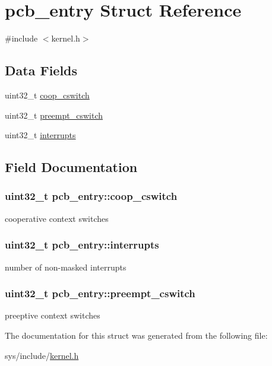 \hypertarget{structpcb__entry}{\section{pcb\-\_\-entry Struct Reference}
\label{structpcb__entry}
}


{\ttfamily \#include $<$kernel.\-h$>$}

\subsection*{Data Fields}
\begin{DoxyCompactItemize}
\item 
uint32\-\_\-t \hyperlink{structpcb__entry_ac5899befd89fa0e8b2aeceed85e01415}{coop\-\_\-cswitch}
\item 
uint32\-\_\-t \hyperlink{structpcb__entry_af49c7195c79f5de2d70825e2252c8d77}{preempt\-\_\-cswitch}
\item 
uint32\-\_\-t \hyperlink{structpcb__entry_ae5474e1d477335caf5515d8a940d1f77}{interrupts}
\end{DoxyCompactItemize}


\subsection{Field Documentation}
\hypertarget{structpcb__entry_ac5899befd89fa0e8b2aeceed85e01415}{
\subsubsection[{coop\-\_\-cswitch}]{\setlength{\rightskip}{0pt plus 5cm}uint32\-\_\-t pcb\-\_\-entry\-::coop\-\_\-cswitch}}\label{structpcb__entry_ac5899befd89fa0e8b2aeceed85e01415}
cooperative context switches \hypertarget{structpcb__entry_ae5474e1d477335caf5515d8a940d1f77}{
\subsubsection[{interrupts}]{\setlength{\rightskip}{0pt plus 5cm}uint32\-\_\-t pcb\-\_\-entry\-::interrupts}}\label{structpcb__entry_ae5474e1d477335caf5515d8a940d1f77}
number of non-\/masked interrupts \hypertarget{structpcb__entry_af49c7195c79f5de2d70825e2252c8d77}{
\subsubsection[{preempt\-\_\-cswitch}]{\setlength{\rightskip}{0pt plus 5cm}uint32\-\_\-t pcb\-\_\-entry\-::preempt\-\_\-cswitch}}\label{structpcb__entry_af49c7195c79f5de2d70825e2252c8d77}
preeptive context switches 

The documentation for this struct was generated from the following file\-:\begin{DoxyCompactItemize}
\item 
sys/include/\hyperlink{kernel_8h}{kernel.\-h}\end{DoxyCompactItemize}
